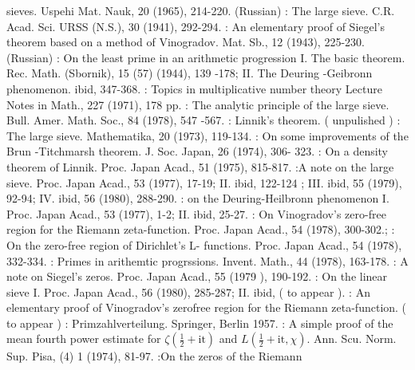 \begin{thebibliography}{99}
  sieves. Uspehi Mat. Nauk, 20 (1965), 214-220. (Russian) 
: The large sieve. C.R. Acad. Sci. URSS
  (N.S.), 30 (1941),  292-294. 
: An elementary proof of Siegel's theorem
  based  on a method of Vinogradov. Mat. Sb., 12 (1943), 225-230. (Russian) 
: On the least prime in an  arithmetic
  progression I. The basic theorem. Rec. Math. (Sbornik), 15 (57)
  (1944), 139 -178; II. The Deuring -Geibronn phenomenon. ibid,
  347-368. 
: Topics in multiplicative number theory
  Lecture Notes in Math., 227 (1971), 178 pp. 
: The analytic principle of the  large
  sieve. Bull. Amer. Math. Soc., 84 (1978), 547 -567. 
: Linnik's theorem. ( unpulished )
: The large
  sieve. Mathematika, 20 (1973),   119-134.   
: On some improvements of the  Brun
  -Titchmarsh theorem. J. Soc. Japan, 26 (1974), 306- 323. 
: On a density theorem of
  Linnik. Proc. Japan  Acad., 51 (1975), 815-817. 
:\pageoriginale A note  on the  large  sieve. Proc. Japan
  Acad., 53 (1977), 17-19;  II.  ibid,  122-124 ; III. ibid,
  55 (1979), 92-94; IV.  ibid, 56 (1980), 288-290. 
: on the Deuring-Heilbronn phenomenon
  I. Proc. Japan Acad.,  53 (1977), 1-2; II. ibid, 25-27. 
: On Vinogradov's zero-free region for the
  Riemann zeta-function. Proc. Japan Acad., 54 (1978), 300-302.; 
: On the zero-free region of Dirichlet's
  L- functions. Proc. Japan Acad., 54 (1978), 332-334. 
: Primes in arithemtic
  progrssions. Invent. Math., 44 (1978), 163-178. 
: A note on Siegel's zeros. Proc. Japan
  Acad., 55 (1979 ), 190-192. 
: On the  linear sieve I. Proc. Japan
  Acad., 56 (1980), 285-287; II.  ibid, ( to appear ). 
: An elementary proof of Vinogradov's
  zerofree region for  the Riemann zeta-function. ( to appear ) 
: Primzahlverteilung. Springer, Berlin 1957.
: A simple proof of the  mean fourth power
  estimate for  $ \zeta \left( \frac{1}{2} +  \text{it}\right)$ and
  $L \left(\frac{1}{2} + \text{it},
  \chi\right)$. Ann. Scu. Norm. Sup. Pisa, (4) 1 (1974), 81-97. 
:\pageoriginale On the zeros of the  Riemann

\end{thebibliography}
